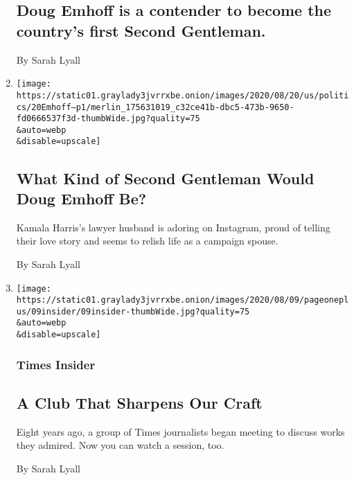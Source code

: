 \begin{enumerate}
  \hypertarget{doug-emhoff-is-a-contender-to-become-the-countrys-first-second-gentleman}{%
  \subsection{Doug Emhoff is a contender to become the country's first
  Second
  Gentleman.}\label{doug-emhoff-is-a-contender-to-become-the-countrys-first-second-gentleman}}

  By Sarah Lyall
\item
  \href{/2020/08/19/us/politics/second-gentleman-doug-emhoff.html}{}

  \texttt{[image: https://static01.graylady3jvrrxbe.onion/images/2020/08/20/us/politics/20Emhoff--p1/merlin\_175631019\_c32ce41b-dbc5-473b-9650-fd0666537f3d-thumbWide.jpg?quality=75\\\&auto=webp\\\&disable=upscale]}

  \hypertarget{what-kind-of-second-gentleman-would-doug-emhoff-be}{%
  \subsection{What Kind of Second Gentleman Would Doug Emhoff
  Be?}\label{what-kind-of-second-gentleman-would-doug-emhoff-be}}

  Kamala Harris's lawyer husband is adoring on Instagram, proud of
  telling their love story and seems to relish life as a campaign
  spouse.

  By Sarah Lyall
\item
  \href{/2020/08/09/insider/this-is-good.html}{}

  \texttt{[image: https://static01.graylady3jvrrxbe.onion/images/2020/08/09/pageoneplus/09insider/09insider-thumbWide.jpg?quality=75\\\&auto=webp\\\&disable=upscale]}

  \hypertarget{times-insider}{%
  \subsubsection{Times Insider}\label{times-insider}}

  \hypertarget{a-club-that-sharpens-our-craft}{%
  \subsection{A Club That Sharpens Our
  Craft}\label{a-club-that-sharpens-our-craft}}

  Eight years ago, a group of Times journalists began meeting to discuss
  works they admired. Now you can watch a session, too.

  By Sarah Lyall
\end{enumerate}

